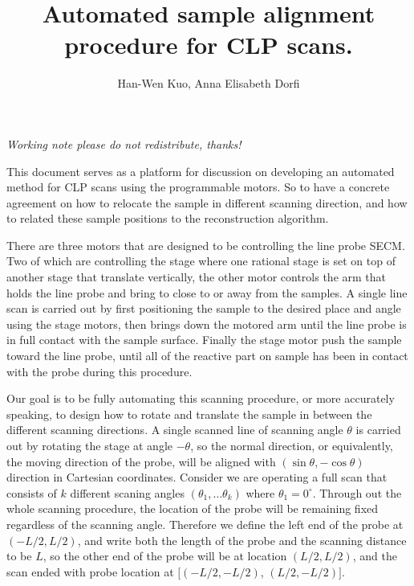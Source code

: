 \documentclass[letter, 10pt]{article}
\numberwithin{equation}{section}
\newcommand{\vsni}{\vspace{.1in} \noindent}
\newcommand{\mr}{\mathrm}
\newcommand{\mc}{\mathcal}
\newcommand{\paren}[1]{ \left( #1 \right) }
\newcommand{\1}{\mathbf 1}
\begin{document}
\title{Automated sample alignment procedure for CLP scans. }
\author{Han-Wen Kuo, Anna Elisabeth Dorfi}

\maketitle
\newcommand{\effarea}{\mc S_{\mr{eff}}}
\newcommand{\effcirc}{\mc C_{\mr{eff}}}
\newcommand{\rotation}{\mr{Rot}}

\vsni \emph{  Working note please do not redistribute, thanks!  }


\vsni This document serves as a platform for discussion on developing an automated method for CLP scans using the programmable motors. So to have a concrete agreement on how to relocate the sample in different scanning direction, and how to related these sample positions to the reconstruction algorithm. 

\vsni There are three motors that are designed to be controlling  the line probe SECM. Two of which are controlling the stage where one rational stage is set on top of another stage that translate vertically, the other motor controls the arm that holds the line probe and bring to close to or away from the samples. A single line scan is carried out by first positioning the sample to the desired place and angle using the stage motors, then brings down the motored arm until the line probe is in full contact with the sample surface. Finally the stage motor push the sample toward  the line probe, until all of the reactive part on sample has been in contact with the probe during this procedure. 

\vsni Our goal is to be fully automating this scanning procedure, or more accurately speaking, to design how to rotate and translate the sample in between the different scanning directions. A single scanned line of scanning angle $\theta$ is carried out by rotating the stage at angle $-\theta$, so the normal direction, or equivalently, the moving direction of the probe, will be aligned with $(\sin\theta,-\cos\theta)$ direction in Cartesian coordinates. Consider we are operating a full scan that consists of $k$ different scaning angles $\paren{\theta_1,\ldots\theta_k}$ where $\theta_1 = 0^\circ $. Through out the whole scanning procedure, the location of the probe will be remaining fixed regardless of the scanning angle. Therefore we define the left end of the probe at $(-L/2,L/2)$, and write both the length of the probe and the scanning distance to be $L$, so the other end of the probe will be at location $(L/2,L/2)$, and the scan ended with probe location at $[(-L/2,-L/2)$, $(L/2,-L/2)]$.  
\end{document}
